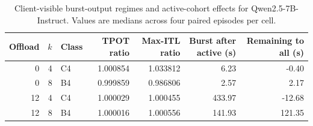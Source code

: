 \begin{table}[t]
\centering
\caption{Client-visible burst-output regimes and active-cohort effects for Qwen2.5-7B-Instruct. Values are medians across four paired episodes per cell.}
\label{tab:qwen-server-waiting}
\begin{tabular}{rrlrrrr}
\toprule
Offload & $k$ & Class & TPOT ratio & Max-ITL ratio & Burst after active (s) & Remaining to all (s) \\
\midrule
0 & 4 & C4 & 1.000854 & 1.033812 & 6.23 & -0.40 \\
0 & 8 & B4 & 0.999859 & 0.986806 & 2.57 & 2.17 \\
12 & 4 & C4 & 1.000029 & 1.000455 & 433.97 & -12.68 \\
12 & 8 & B4 & 1.000016 & 1.000556 & 141.93 & 121.35 \\
\bottomrule
\end{tabular}
\end{table}
